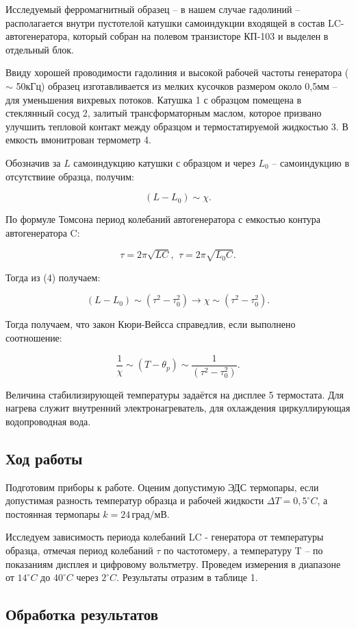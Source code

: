 \documentclass[a4paper, fontsize = 14pt]{article}
\begin{document}
Исследуемый ферромагнитный образец -- в нашем случае гадолиний -- располагается внутри пустотелой катушки самоиндукции входящей в состав LC-автогенератора, который собран на полевом транзисторе КП-103 и выделен в отдельный блок. 

Ввиду хорошей проводимости гадолиния и высокой рабочей частоты генератора ($\sim$ 50кГц) образец изготавливается из мелких кусочков размером около 0,5мм -- для уменьшения вихревых потоков. Катушка 1 с образцом помещена в стеклянный сосуд 2, залитый трансформаторным маслом, которое призвано улучшить тепловой контакт между образцом и термостатируемой жидкостью 3. В емкость вмонитрован термометр 4.

Обозначив за $L$ самоиндукцию катушки с образцом и через $L_0$ -- самоиндукцию в отсутствиие образца, получим:

\begin{equation}
    (L-L_0) \sim \chi.    
\end{equation}

По формуле Томсона период колебаний автогенератора с емкостью контура автогенератора C:

\begin{equation}
    \tau = 2 \pi \sqrt{LC}, \,\
    \tau = 2 \pi \sqrt{L_0C}.
\end{equation}

Тогда из (4) получаем:

\begin{equation}
    (L - L_0) \sim (\tau^2 - \tau_0^2) \longrightarrow \chi \sim (\tau^2 - \tau_0^2).
\end{equation}

Тогда получаем, что закон Кюри-Вейсса справедлив, если выполнено соотношение:

\begin{equation}
    \frac{1}{\chi} \sim (T - \theta_p) \sim \frac{1}{(\tau^2 - \tau_0^2)}.
\end{equation}

Величина стабилизирующей температуры задаётся на дисплее 5 термостата. Для нагрева служит внутренний электронагреватель, для охлаждения циркуллирующая водопроводная вода. 

\subsection*{Ход работы}

Подготовим приборы к работе. Оценим допустимую ЭДС термопары, если допустимая разность температур образца и рабочей жидкости $\Delta T = 0,5 ^\circ C$, а постоянная термопары $k = 24 \, град/мВ$.

Исследуем зависимость периода колебаний LC - генератора от температуры образца, отмечая период колебаний $\tau$ по частотомеру, а температуру T -- по показаниям дисплея и цифровому вольтметру. Проведем измерения в диапазоне от $14 ^\circ C$ до $40 ^\circ C$ через $2 ^\circ C$. Результаты отразим в таблице 1.

\subsection*{Обработка результатов}
\end{document}
